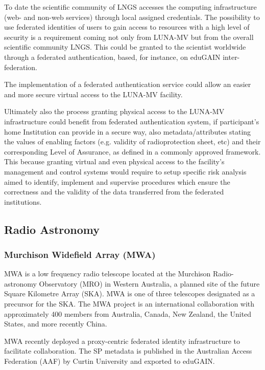\documentclass[fleqn,10pt]{wlscirep}
\begin{document}
{To date the scientific community of LNGS accesses the computing infrastructure (web- and non-web services) through local assigned credentials. The possibility to use federated identities of users to gain access to resources with a high level of security is a requirement coming not only from LUNA-MV but from the overall scientific community LNGS. This could be granted to the scientist worldwide through a federated authentication, based, for instance, on eduGAIN inter-federation.

The implementation of a federated authentication service could allow an easier and more secure virtual access to the LUNA-MV facility. 

Ultimately also the process granting physical access to the LUNA-MV infrastructure could benefit from federated authentication system, if participant’s home  Institution can provide in a secure way, also metadata/attributes stating the values of enabling factors (e.g. validity of radioprotection sheet, etc) and their corresponding Level of Assurance, as defined in a commonly approved framework. This because granting virtual and even physical access to the facility's management and control systems would require to setup specific risk analysis aimed to identify, implement and supervise procedures which ensure the correctness and the validity of the data transferred from the federated institutions.

\subsection{Radio Astronomy}

\subsubsection{Murchison Widefield Array (MWA)}
MWA is a low frequency radio telescope located at the Murchison Radio-astronomy Observatory (MRO) in Western Australia, a planned site of the future Square Kilometre Array (SKA). MWA is one of three telescopes designated as a precursor for the SKA. The MWA project is an international collaboration with approximately 400 members from Australia, Canada, New Zealand, the United States, and more recently China.

MWA recently deployed a proxy-centric federated identity infrastructure to facilitate collaboration. The SP metadata is published in the Australian Access Federation (AAF) by Curtin University and exported to eduGAIN. 

}
\end{document}
